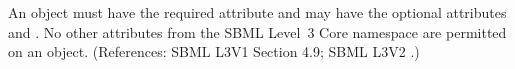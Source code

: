 An \AssignmentRule object must have the required attribute 
and may have the optional attributes   and .
No other attributes from the SBML Level~3 Core namespace are permitted on
an \AssignmentRule object.  (References: SBML L3V1 Section 4.9; SBML L3V2
.)
